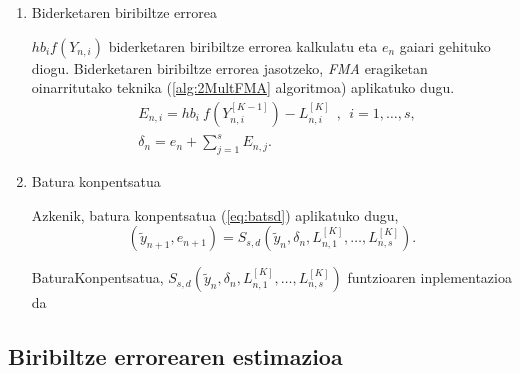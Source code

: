 \begin{enumerate}
\item Biderketaren biribiltze errorea

$hb_i f(Y_{n,i})$ biderketaren biribiltze errorea kalkulatu eta $e_{n}$ gaiari gehituko diogu. Biderketaren biribiltze errorea jasotzeko,  \emph{FMA} eragiketan oinarritutako teknika (\ref{alg:2MultFMA} algoritmoa) aplikatuko dugu. 
\begin{align*}
&E_{n,i}=hb_i \ f(Y^{[K-1]}_{n,i}) - L^{[K]}_{n,i} \ \ , \ \ i=1,\dots,s,\\
&\delta_{n}={e}_{n} + \sum\limits_{j=1}^{s}E_{n,j}.
\end{align*}


\item Batura konpentsatua

Azkenik, batura konpentsatua (\ref{eq:batsd}) aplikatuko dugu,
\begin{equation}
\label{eq:bkLn}
(\tilde y_{n+1}, e_{n+1}) = S_{s,d}(\tilde y_n, \delta_n, L_{n,1}^{[K]}, \dots,L_{n,s}^{[K]}).
\end{equation}

\begin{algorithm}[H]
  \SetAlgoLined\DontPrintSemicolon
  \caption{BaturaKonpentsatua,  $S_{s,d}(\tilde y_n, \delta_n, L_{n,1}^{[K]}, \dots,L_{n,s}^{[K]})$ funtzioaren inplementazioa da}
\end{algorithm} 

\end{enumerate}


\subsection{Biribiltze errorearen estimazioa}
\label{ss:634}

